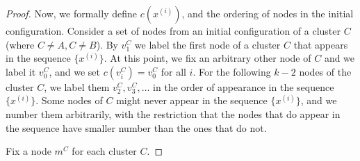 \begin{proof}
  
  Now, we formally define $c(x^{(i)})$, and the ordering of nodes in the initial configuration.
  Consider a set of nodes from an initial configuration of a cluster $C$ (where $C \neq A, C \neq B$).
  By $v^C_1$ we label the first node of a cluster $C$ that appears in the sequence $\{x^{(i)}\}$.
  At this point, we fix an arbitrary other node of $C$ and we label it $v^C_0$, and we set $c(v^C_i) = v^C_0$ for all $i$.
  For the following $k-2$ nodes of the cluster $C$, we label them $v^C_2, v^C_3, \ldots$ in the order of appearance in the sequence $\{x^{(i)}\}$.
  Some nodes of $C$ might never appear in the sequence $\{x^{(i)}\}$, and we number them arbitrarily, with the restriction that the nodes that do appear in the sequence have smaller number than the ones that do not.
  


  

  

 
  
  Fix a node $m^C$ for each cluster $C$.
  
  
  

  
  
\end{proof}

